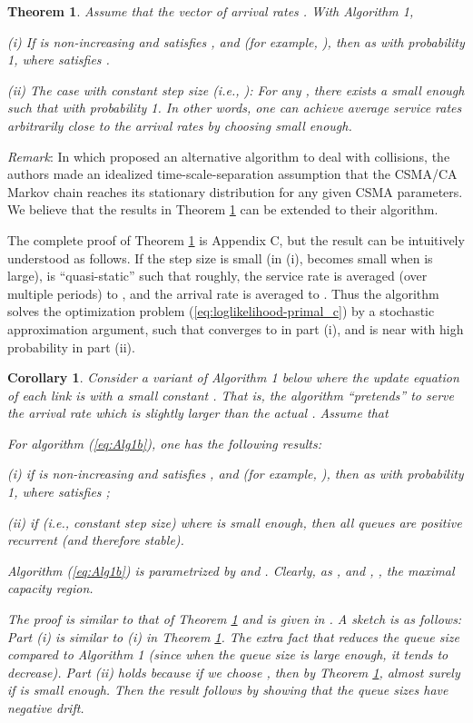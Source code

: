 \documentclass{IEEEtran}
\newtheorem{thm}{Theorem}
\newtheorem{cor}{Corollary}
\begin{document}
\begin{thm}
\label{thm:scheduling}Assume that the vector of arrival rates .
With Algorithm 1, 

(i) If  is non-increasing and satisfies ,
 and  (for example,
), then  as 
with probability 1, where  satisfies .

(ii) The case with constant step size (i.e., ):
For any , there exists a small enough  such
that 
with probability 1. In other words, one can achieve average service
rates arbitrarily close to the arrival rates by choosing 
small enough.
\end{thm}
\emph{Remark}: In \cite{Jian} which proposed an alternative algorithm
to deal with collisions, the authors made an idealized time-scale-separation
assumption that the CSMA/CA Markov chain reaches its stationary distribution
for any given CSMA parameters. We believe that the results in Theorem
\ref{thm:scheduling} can be extended to their algorithm.

The complete proof of Theorem \ref{thm:scheduling} is Appendix C,
but the result can be intuitively understood as follows. If the step
size is small (in (i),  becomes small when  is large),
 is {}``quasi-static'' such that roughly, the service rate
is averaged (over multiple periods) to , and the
arrival rate is averaged to . Thus the algorithm solves
the optimization problem (\ref{eq:loglikelihood-primal_c}) by a stochastic
approximation \cite{Borkar} argument, such that  converges
to  in part (i), and  is near 
with high probability in part (ii). \begin{comment}
(In part (i), it can be further shown that the system is rate stable
\cite{longer_version}.) 
\end{comment}
{}

\medskip{}

\begin{cor}
\label{cor:stable}Consider a variant of Algorithm 1 below where the
update equation of each link  is 
with a small constant . That is, the algorithm {}``pretends''
to serve the arrival rate  which
is slightly larger than the actual . Assume that 


For algorithm (\ref{eq:Alg1b}), one has the following results:

(i) if  is non-increasing and satisfies ,
 and  (for example,
), then  as 
with probability 1, where  satisfies ;

(ii) if  (i.e., constant step size) where 
is small enough, then all queues are positive recurrent (and therefore
stable). 

Algorithm (\ref{eq:Alg1b}) is parametrized by 
and . Clearly, as , 
and , ,
the maximal capacity region.

The proof is similar to that of Theorem \ref{thm:scheduling} and
is given in \cite{longer_version}. A sketch is as follows: Part (i)
is similar to (i) in Theorem \ref{thm:scheduling}. The extra fact
that  reduces the queue
size compared to Algorithm 1 (since when the queue size is large enough,
it tends to decrease). Part (ii) holds because if we choose ,
then by Theorem \ref{thm:scheduling}, 
almost surely if  is small enough. Then the result follows
by showing that the queue sizes have negative drift. 
\end{cor}
\end{document}
